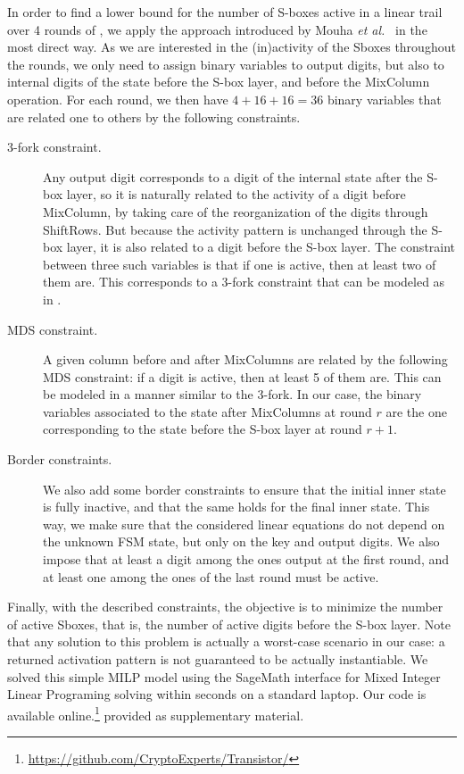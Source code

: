 In order to find a lower bound for the number of \gls{S-box}es active in a linear trail over 4 rounds of \coolName, we apply the approach introduced by Mouha \emph{et al.\@}~\cite{add:MWGP11} in the most direct way. As we are interested in the (in)activity of the Sboxes throughout the rounds, we only need to assign binary variables to output digits, but also to internal digits of the state before the \gls{S-box} layer, and before the MixColumn operation. For each round, we then have $4 + 16 + 16 = 36$ binary variables that are related one to others by the following constraints.
\begin{description}
\item[3-fork constraint.] Any output digit corresponds to a digit of the internal state after the \gls{S-box} layer, so it is naturally related to the activity of a digit before MixColumn, by taking care of the reorganization of the digits through ShiftRows. But because the activity pattern is unchanged through the \gls{S-box} layer, it is also related to a digit before the \gls{S-box} layer. The constraint between three such variables is that if one is active, then at least two of them are. This corresponds to a 3-fork constraint that can be modeled as in \cite[Sec~ 2.2]{add:MWGP11}.
\item[MDS constraint.] A given column before and after MixColumns are related by the following MDS constraint: if a digit is active, then at least 5 of them are. This can be modeled in a manner similar to the 3-fork. In our case, the binary variables associated to the state after MixColumns at round $r$ are the one corresponding to the state before the \gls{S-box} layer at round $r+1$.
\item[Border constraints.] We also add some border constraints to ensure that the initial inner state is fully inactive, and that the same holds for the final inner state. This way, we make sure that the considered linear equations do not depend on the unknown FSM state, but only on the key and output digits. We also impose that at least a digit among the ones output at the first round, and at least one among the ones of the last round must be active.
\end{description}
Finally, with the described constraints, the objective is to minimize the number of active Sboxes, that is, the number of active digits before the \gls{S-box} layer. Note that any solution to this problem is actually a worst-case scenario in our case: a returned activation pattern is not guaranteed to be actually instantiable. We solved this simple MILP model using the SageMath interface for Mixed Integer Linear Programing solving within seconds on a standard laptop. Our code is 
\ifeprint
  available online.\footnote{\url{https://github.com/CryptoExperts/Transistor/}}
\else
  provided as supplementary material.
\fi


